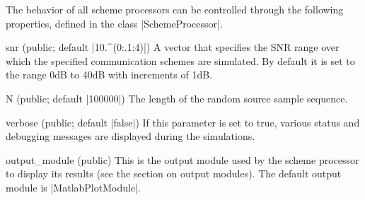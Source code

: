 The behavior of all scheme processors can be controlled through the following
properties, defined in the class |SchemeProcessor|.
\begin{property}{snr (public; default |10.^(0:.1:4)|)}
  A vector that specifies the SNR range over which the specified
  communication schemes are simulated. By default it is set to the range
  0dB to 40dB with increments of 1dB. 
\end{property}

\begin{property}{N (public; default |100000|)}
  The length of the random source sample sequence.
\end{property}
  
\begin{property}{verbose (public; default |false|)}
  If this parameter is set to true, various status and debugging messages are
  displayed during the simulations.
\end{property}

\begin{property}{output_module (public)}
  This is the output module used by the scheme processor to display its
  results (see the section on output modules). The default output module is
  |MatlabPlotModule|.
\end{property}

